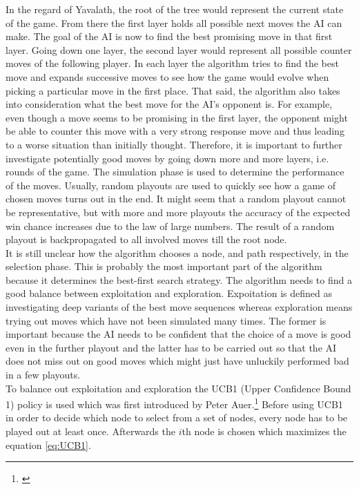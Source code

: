\documentclass[german]{report}
\begin{document}
In the regard of Yavalath, the root of the tree would represent the current
state of the game. From there the first layer holds all possible next moves the
AI can make. The goal of the AI is now to find the best promising move in that
first layer. Going down one layer, the second layer would represent all possible
counter moves of the following player. In each layer the algorithm tries to find
the best move and expands successive moves to see how the game would evolve when
picking a particular move in the first place. That said, the algorithm also
takes into consideration what the best move for the AI's opponent is. For example,
even though a move seems to be promising in the first layer, the opponent might
be able to counter this move with a very strong response move and thus leading
to a worse situation than initially thought. Therefore, it is important to
further investigate potentially good moves by going down more and more layers,
i.e. rounds of the game. The simulation phase is used to determine the
performance of the moves. Usually, random playouts are used to quickly see how a
game of chosen moves turns out in the end. It might seem that a random playout
cannot be representative, but with more and more playouts the accuracy of the
expected win chance increases due to the law of large numbers.
The result of a random playout is backpropagated to all involved moves till the
root node.\\

It is still unclear how the algorithm chooses a node, and path
respectively, in the selection phase. This is probably the most important part
of the algorithm because it determines the best-first search strategy. The
algorithm needs to find a good balance between exploitation and exploration.
Expoitation is defined as investigating deep variants of the best move sequences
whereas exploration means trying out moves which have not been simulated many
times. The former is important because the AI needs to be confident that the
choice of a move is good even in the further playout and the latter has to be
carried out so that the AI does not miss out on good moves which might just have
unluckily performed bad in a few playouts.\\

To balance out exploitation and exploration the UCB1 (Upper Confidence Bound 1)
policy is used which was first introduced by Peter Auer.\footnote{\cite{paper:ucb1}}
Before using UCB1 in order to decide which node to select from a set of nodes,
every node has to be played out at least once. Afterwards the \(i\)th node is
chosen which maximizes the equation \ref{eq:UCB1}.
\end{document}
